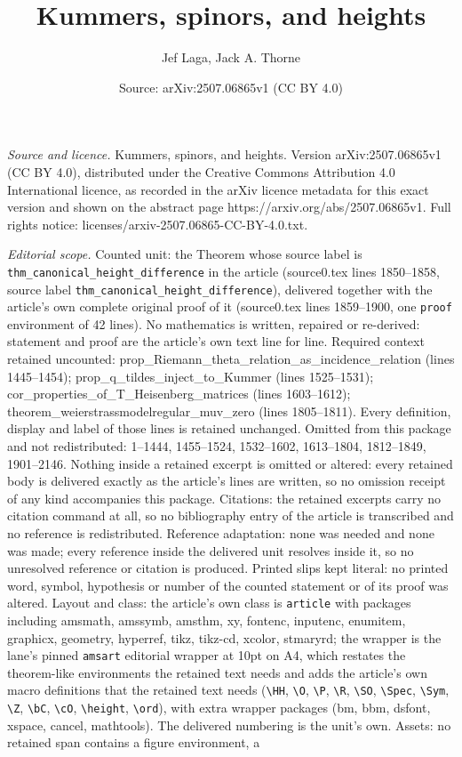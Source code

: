 \documentclass[10pt,a4paper]{amsart}
\title[Kummers, spinors, and heights]{Kummers, spinors, and heights}
\author{Jef Laga, Jack A. Thorne}
\date{Source: arXiv:2507.06865v1 (CC BY 4.0)}
\begin{document}
\maketitle

\noindent\emph{Source and licence.} Kummers, spinors, and heights. Version arXiv:2507.06865v1 (CC BY 4.0), distributed under the Creative Commons Attribution 4.0 International licence, as recorded in the arXiv licence metadata for this exact version and shown on the abstract page https://arxiv.org/abs/2507.06865v1. Full rights notice: licenses/arxiv-2507.06865-CC-BY-4.0.txt.\par\smallskip

\noindent\textit{Editorial scope.} Counted unit: the Theorem whose source label is \texttt{thm\_canonical\_height\_difference} in the article (source0.tex lines 1850--1858, source label \texttt{thm\_canonical\_height\_difference}), delivered together with the article's own complete original proof of it (source0.tex lines 1859--1900, one \texttt{proof} environment of 42 lines). No mathematics is written, repaired or re-derived: statement and proof are the article's own text line for line. Required context retained uncounted: prop\_Riemann\_theta\_relation\_as\_incidence\_relation (lines 1445--1454); prop\_q\_tildes\_inject\_to\_Kummer (lines 1525--1531); cor\_properties\_of\_T\_Heisenberg\_matrices (lines 1603--1612); theorem\_weierstrassmodelregular\_muv\_zero (lines 1805--1811). Every definition, display and label of those lines is retained unchanged. Omitted from this package and not redistributed: 1--1444, 1455--1524, 1532--1602, 1613--1804, 1812--1849, 1901--2146. Nothing inside a retained excerpt is omitted or altered: every retained body is delivered exactly as the article's lines are written, so no omission receipt of any kind accompanies this package. Citations: the retained excerpts carry no citation command at all, so no bibliography entry of the article is transcribed and no reference is redistributed. Reference adaptation: none was needed and none was made; every reference inside the delivered unit resolves inside it, so no unresolved reference or citation is produced. Printed slips kept literal: no printed word, symbol, hypothesis or number of the counted statement or of its proof was altered. Layout and class: the article's own class is \texttt{article} with packages including amsmath, amssymb, amsthm, xy, fontenc, inputenc, enumitem, graphicx, geometry, hyperref, tikz, tikz-cd, xcolor, stmaryrd; the wrapper is the lane's pinned \texttt{amsart} editorial wrapper at 10pt on A4, which restates the theorem-like environments the retained text needs and adds the article's own macro definitions that the retained text needs (\texttt{\textbackslash HH}, \texttt{\textbackslash O}, \texttt{\textbackslash P}, \texttt{\textbackslash R}, \texttt{\textbackslash SO}, \texttt{\textbackslash Spec}, \texttt{\textbackslash Sym}, \texttt{\textbackslash Z}, \texttt{\textbackslash bC}, \texttt{\textbackslash cO}, \texttt{\textbackslash height}, \texttt{\textbackslash ord}), with extra wrapper packages (bm, bbm, dsfont, xspace, cancel, mathtools). The delivered numbering is the unit's own. Assets: no retained span contains a figure environment, a 
\end{document}

